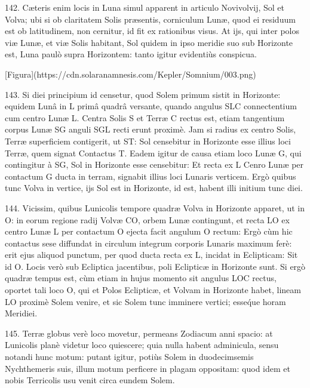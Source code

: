 \documentclass[a4paper, 11pt, oneside, polutonikogreek, german]{article}
\begin{document}
142. Cæteris enim locis in Luna simul apparent in articulo Novivolvij, Sol et Volva; ubi si ob claritatem Solis præsentis, corniculum Lunæ, quod ei residuum est ob latitudinem, non cernitur, id fit ex rationibus visus. At ijs, qui inter polos viæ Lunæ, et viæ Solis habitant, Sol quidem in ipso meridie suo sub Horizonte est, Luna paulò supra Horizontem: tanto igitur evidentiùs conspicua.

[Figura](https://cdn.solaranamnesis.com/Kepler/Somnium/003.png)

143. Si diei principium id censetur, quod Solem primum sistit in Horizonte: equidem Lunâ in L primâ quadrâ versante, quando angulus SLC connectentium cum centro Lunæ L. Centra Solis S et Terræ C rectus est, etiam tangentium corpus Lunæ SG anguli SGL recti erunt proximè. Jam si radius ex centro Solis, Terræ superficiem contigerit, ut ST: Sol censebitur in Horizonte esse illius loci Terræ, quem signat Contactus T. Eadem igitur de causa etiam loco Lunæ G, qui contingitur à SG, Sol in Horizonte esse censebitur: Et recta ex L Cenro Lunæ per contactum G ducta in terram, signabit illius loci Lunaris verticem. Ergò quibus tunc Volva in vertice, ijs Sol est in Horizonte, id est, habent illi initium tunc diei.

144. Vicissim, quibus Lunicolis tempore quadræ Volva in Horizonte apparet, ut in O: in eorum regione radij Volvæ CO, orbem Lunæ contingunt, et recta LO ex centro Lunæ L per contactum O ejecta facit angulum O rectum: Ergò cùm hic contactus sese diffundat in circulum integrum corporis Lunaris maximum ferè: erit ejus aliquod punctum, per quod ducta recta ex L, incidat in Eclipticam: Sit id O. Locis verò sub Ecliptica jacentibus, poli Eclipticæ in Horizonte sunt. Si ergò quadræ tempus est, cùm etiam in hujus momento sit angulus LOC rectus, oportet tali loco O, qui et Polos Eclipticæ, et Volvam in Horizonte habet, lineam LO proximè Solem venire, et sic Solem tunc imminere vertici; esse\'que horam Meridiei.

145. Terræ globus verè loco movetur, permeans Zodiacum anni spacio: at Lunicolis planè videtur loco quiescere; quia nulla habent adminicula, sensu notandi hunc motum: putant igitur, potiùs Solem in duodecimsemis Nychthemeris suis, illum motum perficere in plagam oppositam: quod idem et nobis Terricolis usu venit circa eundem Solem.
\end{document}
